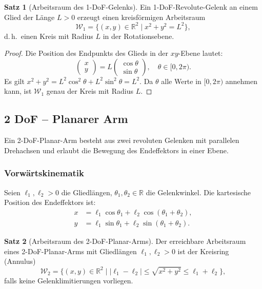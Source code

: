 ﻿\documentclass[a4paper,12pt]{article}
\theoremstyle{definition}
\newtheorem{satz}{Satz}
\begin{document}
\begin{satz}[Arbeitsraum des 1-DoF-Gelenks]
	Ein 1-DoF-Revolute-Gelenk an einem Glied der Länge $L > 0$ erzeugt einen kreisförmigen Arbeitsraum
	\[
		\mathcal{W}_1 = \{(x, y) \in \mathbb{R}^2 \mid x^2 + y^2 = L^2\},
	\]
	d.\,h.\ einen Kreis mit Radius $L$ in der Rotationsebene.
\end{satz}

\begin{proof}
	Die Position des Endpunkts des Glieds in der $xy$-Ebene lautet:
	\[
		\begin{pmatrix} x \\ y \end{pmatrix} = L \begin{pmatrix} \cos\theta \\ \sin\theta \end{pmatrix}, \quad \theta \in [0, 2\pi).
	\]
	Es gilt $x^2 + y^2 = L^2 \cos^2\theta + L^2 \sin^2\theta = L^2$. Da $\theta$ alle Werte in $[0,2\pi)$ annehmen kann, ist $\mathcal{W}_1$ genau der Kreis mit Radius $L$. \qedhere
\end{proof}

\subsection{2 DoF -- Planarer Arm}

Ein 2-DoF-Planar-Arm besteht aus zwei revoluten Gelenken mit parallelen Drehachsen und erlaubt die Bewegung des Endeffektors in einer Ebene.

\subsubsection{Vorwärtskinematik}

Seien $\ell_1, \ell_2 > 0$ die Gliedlängen, $\theta_1, \theta_2 \in \mathbb{R}$ die Gelenkwinkel. Die kartesische Position des Endeffektors ist:
\begin{align}
	x &= \ell_1 \cos\theta_1 + \ell_2 \cos(\theta_1 + \theta_2), \label{eq:fk2x} \\
	y &= \ell_1 \sin\theta_1 + \ell_2 \sin(\theta_1 + \theta_2). \label{eq:fk2y}
\end{align}

\begin{satz}[Arbeitsraum des 2-DoF-Planar-Arms]
\label{satz:ws2}
	Der erreichbare Arbeitsraum eines 2-DoF-Planar-Arms mit Gliedlängen $\ell_1, \ell_2 > 0$ ist der Kreisring (Annulus)
	\[
		\mathcal{W}_2 = \{(x,y) \in \mathbb{R}^2 \mid |\ell_1 - \ell_2| \leq \sqrt{x^2+y^2} \leq \ell_1 + \ell_2\},
	\]
	falls keine Gelenklimitierungen vorliegen.
\end{satz}
\end{document}
